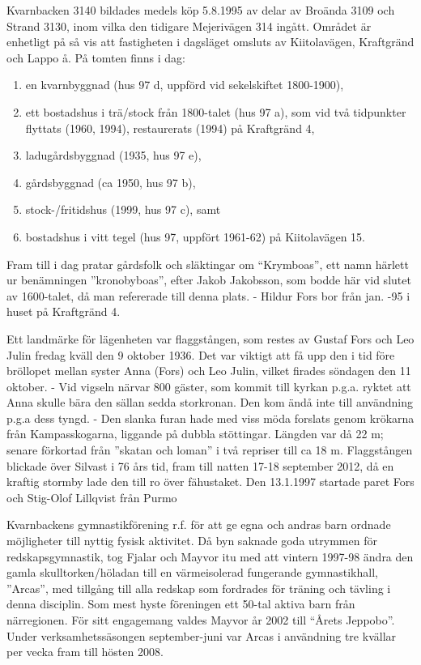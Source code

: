 Kvarnbacken 3140 bildades medels köp 5.8.1995 av delar av Broända 3109 och Strand 3130, inom vilka den tidigare Mejerivägen 314 ingått. Området är enhetligt på så vis att fastigheten i dagsläget omsluts av Kiitolavägen, Kraftgränd och Lappo å. På tomten finns i dag:
\begin{enumerate}
  \item en kvarnbyggnad (hus 97 d, uppförd vid sekelskiftet 1800-1900),
  \item ett bostadshus i trä/stock från 1800-talet (hus 97 a), som vid två tidpunkter flyttats (1960, 1994), restaurerats (1994) på Kraftgränd 4,
  \item ladugårdsbyggnad (1935, hus 97 e),
  \item gårdsbyggnad (ca 1950, hus 97 b),
  \item stock-/fritidshus (1999, hus 97 c), samt
  \item bostadshus i vitt tegel (hus 97, uppfört 1961-62) på Kiitolavägen 15.
\end{enumerate}
Fram till i dag pratar gårdsfolk och släktingar om ``Krymboas'', ett namn härlett ur benämningen ”kronobyboas”, efter Jakob Jakobsson, som bodde här vid slutet av 1600-talet, då man refererade till denna plats. - Hildur Fors bor från jan. -95 i huset på Kraftgränd 4.

Ett landmärke för lägenheten var flaggstången, som restes av Gustaf Fors och Leo Julin fredag kväll den 9 oktober 1936. Det var viktigt att få upp den i tid före bröllopet mellan syster Anna (Fors) och Leo Julin, vilket firades söndagen den 11 oktober. - Vid vigseln närvar 800 gäster, som kommit till kyrkan p.g.a. ryktet att Anna skulle bära den sällan sedda storkronan. Den kom ändå inte till användning p.g.a dess tyngd. - Den slanka furan hade med viss möda forslats genom krökarna från Kampasskogarna, liggande på dubbla stöttingar. Längden var då 22 m; senare förkortad från ”skatan och loman” i två repriser till ca 18 m. Flaggstången blickade över Silvast i 76 års tid, fram till natten 17-18 september 2012, då en kraftig stormby lade den till ro över fähustaket. Den 13.1.1997 startade paret Fors och Stig-Olof Lillqvist från Purmo

Kvarnbackens gymnastikförening r.f. för att ge egna och andras barn ordnade möjligheter till nyttig fysisk aktivitet. Då byn saknade goda utrymmen för redskapsgymnastik, tog Fjalar och Mayvor itu med att vintern 1997-98 ändra den gamla skulltorken/höladan till en värmeisolerad fungerande gymnastikhall, ”Arcas”, med tillgång till alla redskap som fordrades för träning och tävling i denna disciplin. Som mest hyste föreningen ett 50-tal aktiva barn från närregionen. För sitt engagemang valdes Mayvor år 2002 till ``Årets Jeppobo''. Under verksamhetssäsongen september-juni var Arcas i användning tre kvällar per vecka fram till hösten 2008.

